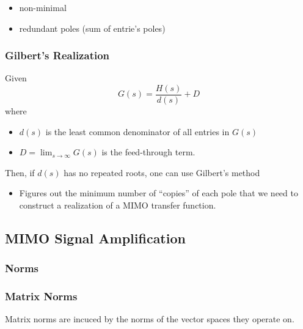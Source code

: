 
\begin{itemize}
    \item non-minimal
    \item redundant poles (sum of entrie's poles)
\end{itemize}

\subsubsection{Gilbert's Realization}


Given
\begin{equation*}
    G(s)=\frac{H(s)}{d(s)}+D
\end{equation*}
where
\begin{itemize}
    \item $d(s)$ is the least common denominator of all entries in $G(s)$
    \item $D=\lim_{s\to\infty}G(s)$ is the feed-through term.
\end{itemize}

Then, if $d(s)$ has no repeated roots, one can use Gilbert's method



\begin{itemize}
    \item Figures out the minimum number of ``copies'' of each pole that we need to construct a realization of a MIMO transfer function.
\end{itemize}

\subsection{MIMO Signal Amplification}
\subsubsection{Norms}



\subsubsection{Matrix Norms}
Matrix norms are incuced by the norms of the vector spaces they operate on.




